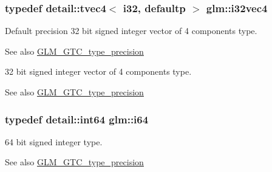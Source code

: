 \subsubsection[{\texorpdfstring{i32vec4}{i32vec4}}]{\setlength{\rightskip}{0pt plus 5cm}typedef detail\+::tvec4$<$ i32, defaultp $>$ {\bf glm\+::i32vec4}}\hypertarget{group__gtc__type__precision_ga5fea6ade2c848bca1fa55636e75a10b9}{}\label{group__gtc__type__precision_ga5fea6ade2c848bca1fa55636e75a10b9}
Default precision 32 bit signed integer vector of 4 components type. \begin{DoxySeeAlso}{See also}
\hyperlink{group__gtc__type__precision}{G\+L\+M\+\_\+\+G\+T\+C\+\_\+type\+\_\+precision}
\end{DoxySeeAlso}
32 bit signed integer vector of 4 components type. \begin{DoxySeeAlso}{See also}
\hyperlink{group__gtc__type__precision}{G\+L\+M\+\_\+\+G\+T\+C\+\_\+type\+\_\+precision} 
\end{DoxySeeAlso}
\subsubsection[{\texorpdfstring{i64}{i64}}]{\setlength{\rightskip}{0pt plus 5cm}typedef detail\+::int64 {\bf glm\+::i64}}\hypertarget{group__gtc__type__precision_gac7a7eaad46064fc952b06df33689da23}{}\label{group__gtc__type__precision_gac7a7eaad46064fc952b06df33689da23}
64 bit signed integer type. \begin{DoxySeeAlso}{See also}
\hyperlink{group__gtc__type__precision}{G\+L\+M\+\_\+\+G\+T\+C\+\_\+type\+\_\+precision} 
\end{DoxySeeAlso}
